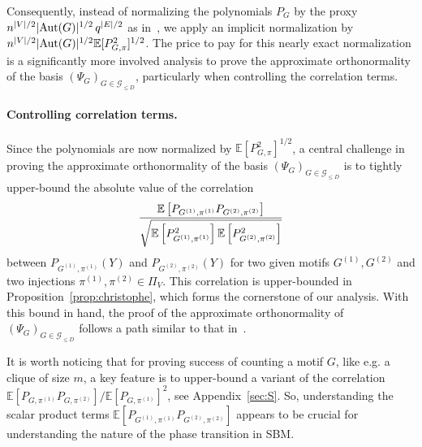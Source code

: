 \documentclass[final]{colt2026}
\newcommand{\1}{\mathbf{1}}
\newcommand{\bbE}{\mathbb{E}}
\newcommand{\cro}[1]{\left[#1\right]}
\begin{document}
Consequently, instead of normalizing the polynomials $P_{G}$ by the proxy $n^{|V|/2} |{\rm Aut}(G)|^{1/2}\, q^{|E|/2}$ as in~\cite{CGGV25}, we apply an implicit normalization by $n^{|V|/2} |{\rm Aut}(G)|^{1/2}\bbE[P_{G,\pi}^2]^{1/2}$. The price to pay for this nearly exact normalization is a significantly more involved analysis to prove the approximate orthonormality of the basis $(\Psi_{G})_{G\in \mathcal{G}_{\leq D}}$, particularly when controlling the correlation terms.



\paragraph{Controlling correlation terms.}
Since the polynomials are now normalized by $\bbE[P_{G,\pi}^2]^{1/2}$, a central challenge in proving the approximate orthonormality of the basis $(\Psi_{G})_{G\in \mathcal{G}_{\leq D}}$ is to tightly upper-bound the absolute value of the correlation
$${\bbE\cro{P_{G^{(1)},\pi^{(1)}}P_{G^{(2)},\pi^{(2)}}}\over
\sqrt{\bbE\cro{P_{G^{(1)},\pi^{(1)}}^2} \bbE\cro{P_{G^{(2)},\pi^{(2)}}^2}}}$$
between $P_{G^{(1)},\pi^{(1)}}(Y)$ and $P_{G^{(2)},\pi^{(2)}}(Y)$ for two given motifs $G^{(1)},G^{(2)}$ and two injections $\pi^{(1)},\pi^{(2)}\in\Pi_{V}$. 
This correlation is upper-bounded in Proposition~\ref{prop:christophe}, which forms the cornerstone of our analysis. With this bound in hand, the proof of the approximate orthonormality of $(\Psi_{G})_{G\in \mathcal{G}_{\leq D}}$ follows a path similar to that in~\cite{CGGV25}.


It is worth noticing that for proving success of counting a motif $G$, like e.g. a clique of size $m$, a key feature is to upper-bound a variant of the correlation
${\bbE[P_{G,\pi^{(1)}}P_{G,\pi^{(2)}}]/ \bbE[P_{G,\pi^{(1)}}]^2}$,
see Appendix~\ref{sec:S}. So, understanding the scalar product terms $\bbE[P_{G^{(1)},\pi^{(1)}}P_{G^{(2)},\pi^{(2)}}]$ appears to be crucial for understanding the nature of the phase transition in SBM. 
\end{document}
